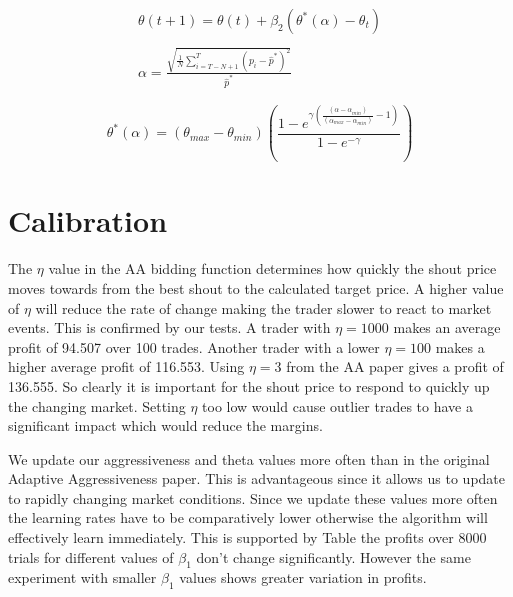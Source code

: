\documentclass[preprint]{acm_proc_article-sp} %
\begin{document}

\begin{equation}
\label{eqn:update_theta}
\begin{split}
    \theta(t+1)=\theta(t)+\beta_2(\theta^*(\alpha)-\theta_t)\\\\
    \alpha = \frac{\sqrt{\frac 1 N \sum^T_{i=T-N+1}(p_i-\hat p^*)^2}}{\hat p^*}
\end{split}
\end{equation}

\begin{equation}
\theta^*(\alpha) = (\theta_{max}-\theta_{min})
\left(\frac{1-e^{\gamma\left(\frac{(\alpha-\alpha_{min})}{(\alpha_{max}
-\alpha_{min})}-1\right)}}{1-e^{-\gamma}}\right)
\label{thetastar}
\end{equation}

\section{Calibration} \label{sec:calibration}
The $\eta$ value in the AA bidding function determines how quickly the shout
price moves towards from the best shout to the calculated target price. A
higher value of $\eta$ will reduce the rate of change making the trader slower
to react to market events. This is confirmed by our tests. A trader with $\eta
= 1000$ makes an average profit of 94.507 over 100 trades. Another trader with
a lower $\eta = 100$ makes a higher average profit of 116.553. Using $\eta = 3$
from the AA paper gives a profit of 136.555. So clearly it is important for the
shout price to respond to quickly up the changing market. Setting $\eta$ too
low would cause outlier trades to have a significant impact which would reduce
the margins.

We update our aggressiveness and theta values more often than in the original Adaptive Aggressiveness 
paper\cite{AA_thesis}. This is advantageous since it allows us to update to rapidly changing market 
conditions. Since we update these values more often the learning rates have to be comparatively lower 
otherwise the algorithm will effectively learn immediately. This is supported by Table 
the profits over 8000 trials for different values of $\beta_1$ don't change significantly. However 
the same experiment with smaller $\beta_1$ values shows greater variation in profits.
\end{document}
